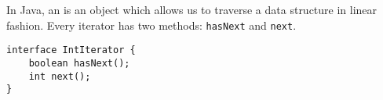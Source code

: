In Java, an  is an object which allows us to traverse a data
structure in linear fashion. Every iterator has two methods:
\lstinline$hasNext$ and \lstinline$next$.

\begin{lstlisting}
interface IntIterator {
    boolean hasNext();
    int next();
}
\end{lstlisting}
